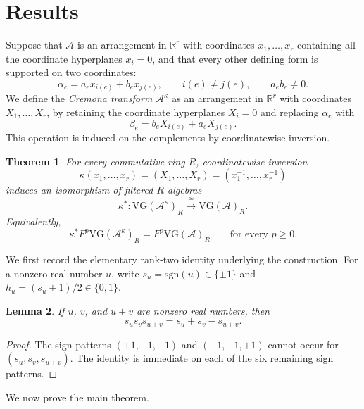 \documentclass{amsart}
\numberwithin{equation}{section}
\newtheorem{thm}{Theorem}[section]
\theoremstyle{plain}
\newtheorem{lem}[thm]{Lemma}
\theoremstyle{remark}
\theoremstyle{definition}
\numberwithin{equation}{section}
\newcommand{\R}{\mathbb{R}}
\newcommand{\A}{\mathcal{A}}
\newcommand{\VG}{\mathrm{VG}}
\newcommand{\sgn}{\mathrm{sgn}}
\begin{document}
\section{Results}\label{cremona}

Suppose that $\A$ is an arrangement in $\R^r$ with coordinates $x_1,\ldots,x_r$ containing all the coordinate hyperplanes $x_i=0$, and that every other defining form is supported on two coordinates:
\[
\alpha_e=a_ex_{i(e)}+b_ex_{j(e)},
\qquad i(e)\neq j(e),\qquad a_eb_e\neq0.
\]
We define the \emph{Cremona transform} $\A^\kappa$ as an arrangement in $\R^r$ with coordinates $X_1,\ldots,X_r$, by retaining the coordinate hyperplanes $X_i=0$ and replacing $\alpha_e$ with
\[
\beta_e=b_eX_{i(e)}+a_eX_{j(e)}.
\]
This operation is induced on the complements by coordinatewise inversion.

\begin{thm}\label{main}
For every commutative ring $R$, coordinatewise inversion
\[
\kappa(x_1,\ldots,x_r)=(X_1,\ldots,X_r)=\left(x_1^{-1},\ldots,x_r^{-1}\right)
\]
induces an isomorphism of filtered $R$-algebras
\[
\kappa^*:\VG(\A^\kappa)_R\xrightarrow{\ \cong\ }\VG(\A)_R.
\]
Equivalently,
\[
\kappa^*F^p\VG(\A^\kappa)_R=F^p\VG(\A)_R
\qquad\text{for every }p\geq0.
\]
\end{thm}


We first record the elementary rank-two identity underlying the construction.  For a nonzero real number $u$, write $s_u=\sgn(u)\in\{\pm1\}$ and $h_u=(s_u+1)/2\in\{0,1\}$.

\begin{lem}\label{sign-identity}
If $u$, $v$, and $u+v$ are nonzero real numbers, then
\[
s_us_vs_{u+v}=s_u+s_v-s_{u+v}.
\]
\end{lem}

\begin{proof}
The sign patterns $(+1,+1,-1)$ and $(-1,-1,+1)$ cannot occur for $(s_u,s_v,s_{u+v})$.  The identity is immediate on each of the six remaining sign patterns.
\end{proof}

We now prove the main theorem.
\end{document}
